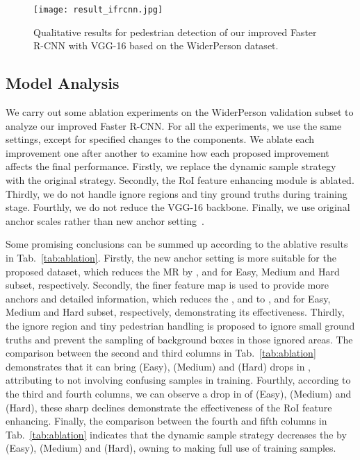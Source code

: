 \documentclass[journal]{IEEEtran}
\begin{document}
\begin{figure*}[t]
\centering
\texttt{[image: result\_ifrcnn.jpg]}
\caption{Qualitative results for pedestrian detection of our improved Faster R-CNN with VGG-16 based on the WiderPerson dataset.}
\label{fig:result_frcnn}
\end{figure*}

\subsection{Model Analysis}
We carry out some ablation experiments on the WiderPerson validation subset to analyze our improved Faster R-CNN. For all the experiments, we use the same settings, except for specified changes to the components. We ablate each improvement one after another to examine how each proposed improvement affects the final performance. Firstly, we replace the dynamic sample strategy with the original strategy. Secondly, the RoI feature enhancing module is ablated. Thirdly, we do not handle ignore regions and tiny ground truths during training stage. Fourthly, we do not reduce the VGG-16 backbone. Finally, we use original anchor scales rather than new anchor setting~\cite{DBLP:conf/cvpr/ZhangBS17}.

Some promising conclusions can be summed up according to the ablative results in Tab.~\ref{tab:ablation}. Firstly, the new anchor setting is more suitable for the proposed dataset, which reduces the MR by ,  and  for Easy, Medium and Hard subset, respectively. Secondly, the finer feature map is used to provide more anchors and detailed information, which reduces the  ,  and  to ,  and  for Easy, Medium and Hard subset, respectively, demonstrating its effectiveness. Thirdly, the ignore region and tiny pedestrian handling is proposed to ignore small ground truths and prevent the sampling of background boxes in those ignored areas. The comparison between the second and third columns in Tab.~\ref{tab:ablation} demonstrates that it can bring  (Easy),  (Medium) and  (Hard) drops in , attributing to not involving confusing samples in training. Fourthly, according to the third and fourth columns, we can observe a drop in  of  (Easy),  (Medium) and  (Hard), these sharp declines demonstrate the effectiveness of the RoI feature enhancing. Finally, the comparison between the fourth and fifth columns in Tab.~\ref{tab:ablation} indicates that the dynamic sample strategy decreases the  by  (Easy),  (Medium) and  (Hard), owning to making full use of training samples.
\end{document}
